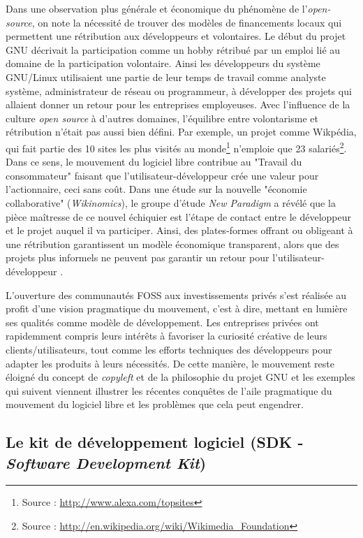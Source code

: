 Dans une observation plus générale et économique du phénomène de l'\emph{open-source}, on note la nécessité de trouver des modèles de financements locaux qui permettent une rétribution aux développeurs et volontaires. Le début du projet GNU décrivait la participation comme un hobby rétribué par un emploi lié au domaine de la participation volontaire. Ainsi les développeurs du système GNU/Linux utilisaient une partie de leur temps de travail comme analyste système, administrateur de réseau ou programmeur, à développer des projets qui allaient donner un retour pour les entreprises employeuses. Avec l'influence de la culture \emph{open source} à d'autres domaines, l'équilibre entre volontarisme et rétribution n'était pas aussi bien défini. Par exemple, un projet comme Wikpédia, qui fait partie des 10 sites les plus visités au monde\footnote{Source : \url{http://www.alexa.com/topsites}} n'emploie que 23 salariés\footnote{Source : \url{http://en.wikipedia.org/wiki/Wikimedia\_Foundation}}. Dans ce sens, le mouvement du logiciel libre contribue au "Travail du consommateur" \citep{Dujarier2008} faisant que l'utilisateur-développeur crée une valeur pour l'actionnaire, ceci sans coût. Dans une étude sur la nouvelle "économie collaborative" (\emph{Wikinomics}), le groupe d'étude \emph{New Paradigm} a révélé que la pièce maîtresse de ce nouvel échiquier est l'étape de contact entre le développeur et le projet auquel il va participer. Ainsi, des plates-formes offrant ou obligeant à une rétribution garantissent un modèle économique transparent, alors que des projets plus informels ne peuvent pas garantir un retour pour l'utilisateur-développeur \citep{Tapscott+Williams2008}.

L'ouverture des communautés FOSS aux investissements privés s'est réalisée au profit d'une vision pragmatique du mouvement, c'est à dire, mettant en lumière ses qualités comme modèle de développement. Les entreprises privées ont rapidemment compris leurs intérêts à favoriser la curiosité créative de leurs clients/utilisateurs, tout comme les efforts techniques des développeurs pour adapter les produits à leurs nécessités. De cette manière, le mouvement reste éloigné du concept de \emph{copyleft} et de la philosophie du projet GNU et les exemples qui suivent viennent illustrer les récentes conquêtes de l'aile pragmatique du mouvement du logiciel libre et les problèmes que cela peut engendrer.

\subsection[Le Kit de Développement Logiciel]{Le kit de développement logiciel (SDK - \emph{Software Development Kit})} \label{1.4.1}


